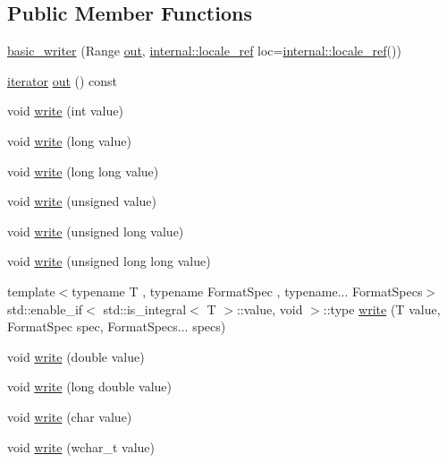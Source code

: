 \subsection*{Public Member Functions}
\begin{DoxyCompactItemize}
\item 
\hyperlink{classbasic__writer_adf48e39fa8f224aad0d3e1da992d505d}{basic\+\_\+writer} (Range \hyperlink{classbasic__writer_abeb203681ca5e1d2b5fe1d2a7bbd7996}{out}, \hyperlink{classinternal_1_1locale__ref}{internal\+::locale\+\_\+ref} loc=\hyperlink{classinternal_1_1locale__ref}{internal\+::locale\+\_\+ref}())
\item 
\hyperlink{classbasic__writer_a8e2b191740ebdbd67284ff5d5647ff62}{iterator} \hyperlink{classbasic__writer_abeb203681ca5e1d2b5fe1d2a7bbd7996}{out} () const
\item 
void \hyperlink{classbasic__writer_a1d44923710a19cdeb09ca5e834641ea8}{write} (int value)
\item 
void \hyperlink{classbasic__writer_a93f39d53e8c24f5de9522a02ca039f52}{write} (long value)
\item 
void \hyperlink{classbasic__writer_a928529c6c90018e60784c3ecd0a01aee}{write} (long long value)
\item 
void \hyperlink{classbasic__writer_adb334d561ee8eaa8cddf802474df5f61}{write} (unsigned value)
\item 
void \hyperlink{classbasic__writer_a06f88cd4866e68b27bf64c96ec8582c4}{write} (unsigned long value)
\item 
void \hyperlink{classbasic__writer_a2ba7259021f6b8dc58add730649af065}{write} (unsigned long long value)
\item 
{\footnotesize template$<$typename T , typename Format\+Spec , typename... Format\+Specs$>$ }\\std\+::enable\+\_\+if$<$ std\+::is\+\_\+integral$<$ T $>$\+::value, void $>$\+::type \hyperlink{classbasic__writer_a87b081da019e2423162de1491d62b796}{write} (T value, Format\+Spec spec, Format\+Specs... specs)
\item 
void \hyperlink{classbasic__writer_aa1734a46d67c4f0aa23c45c648360d61}{write} (double value)
\item 
void \hyperlink{classbasic__writer_a76b033a93868ee4692055c9567436c7a}{write} (long double value)
\item 
void \hyperlink{classbasic__writer_a1046134b869e509059ab496f1f6e9ab9}{write} (char value)
\item 
void \hyperlink{classbasic__writer_a343bc30c71b3fcd298c0ddd78bf9e8ee}{write} (wchar\+\_\+t value)

\end{DoxyCompactItemize}
